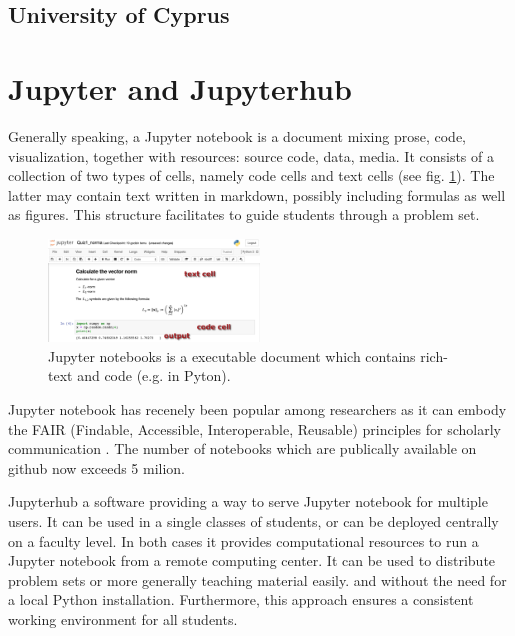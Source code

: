 \documentclass[twocolumn]{svjour3}          %
\begin{document}
\subsection{University of Cyprus}





\section{Jupyter and Jupyterhub}
\label{sec:jupyter_jupyterhub}

Generally speaking, a Jupyter notebook is a document mixing prose,
code, visualization, together with resources: source code, data,
media.  It consists of a collection of two types of cells, namely code
cells and text cells (see fig. \ref{fig:notebook}). The latter may
contain text written in markdown, possibly including formulas as well
as figures. This structure facilitates to guide students through a
problem set.

\begin{figure}
  \includegraphics[width=0.5\textwidth]{figs/notebook.png}
\caption{Jupyter notebooks is a executable document which contains
  rich-text and code (e.g. in Pyton). }
\label{fig:notebook}
\end{figure}

Jupyter notebook has recenely been popular among researchers as it can
embody the FAIR (Findable, Accessible, Interoperable, Reusable)
principles for scholarly communication \cite{Randles2017}. The number
of notebooks which are publically available on github now exceeds 5
milion.


Jupyterhub a software providing a way to serve Jupyter notebook for
multiple users. It can be used in a single classes of students, or can
be deployed centrally on a faculty level. In both cases it provides
computational resources to run a Jupyter notebook from a remote
computing center. It can be used to distribute problem sets or more
generally teaching material easily. and without the need for a local
Python installation. Furthermore, this approach ensures a consistent
working environment for all students.
\end{document}
